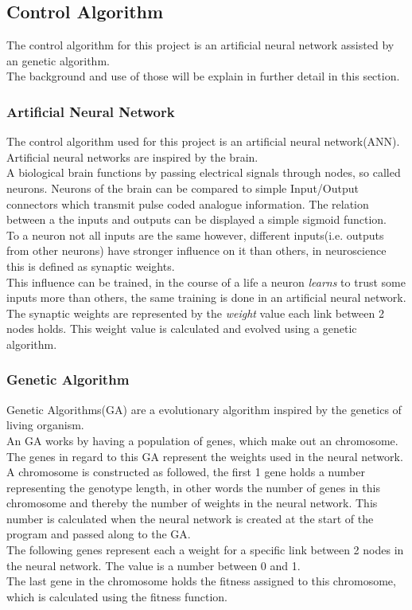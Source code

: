 \subsection{Control Algorithm}
The control algorithm for this project is an artificial neural network assisted by an genetic algorithm.\\
The background and use of those will be explain in further detail in this section.

\subsubsection{Artificial Neural Network}
The control algorithm used for this project is an artificial neural network(ANN).
Artificial neural networks are inspired by the brain. \\
A biological brain functions by passing electrical signals through nodes, so called neurons. Neurons of the brain can be compared to simple Input/Output connectors which transmit pulse coded analogue information. The relation between a the inputs and outputs can be displayed a simple sigmoid function\cite{Hopfield}.\\
To a neuron not all inputs are the same however, different inputs(i.e. outputs from other neurons) have stronger influence on it than others, in neuroscience this is defined as synaptic weights. \\
This influence can be trained, in the course of a life a neuron \textit{learns} to trust some inputs more than others, the same training is done in an artificial neural network. The synaptic weights are represented by the \textit{weight} value each link between 2 nodes holds. This weight value is calculated and evolved using a genetic algorithm. 

\subsubsection{Genetic Algorithm}
Genetic Algorithms(GA) are a evolutionary algorithm inspired by the genetics of living organism. \\
An GA works by having a population  of genes, which make out an chromosome. The genes in regard to this GA represent the weights used in the neural network. \\
A chromosome is constructed as followed, the first 1 gene holds a number representing the genotype length, in other words the number of genes in this chromosome and thereby the number of weights in the neural network. This number is calculated when the neural network is created at the start of the program and passed along to the GA.\\
The following genes represent each a weight for a specific link between 2 nodes in the neural network. The value is a number between 0 and 1. \\
The last gene in the chromosome holds the fitness assigned to this chromosome, which is calculated using the fitness function.\\


